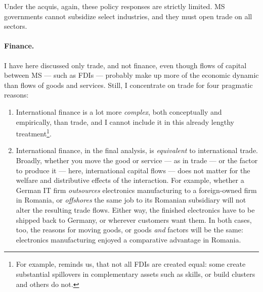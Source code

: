 Under the acquis, again, these policy responses are strictly limited. \gls{MS} governments cannot subsidize select industries, and they must open trade on all sectors.

\paragraph{Finance.} I have here discussed only trade, and not finance, even though flows of capital between \gls{MS} --- such as \glspl{FDI} --- probably make up more of the economic dynamic than flows of goods and services. Still, I concentrate on trade for four pragmatic reasons:
\begin{enumerate}
	\item International finance is a lot more \emph{complex}, both conceptually and empirically, than trade, and I cannot include it in this already lengthy treatment\footnote{
		For example, \cite{Narula2005} reminds us, that not all \glspl{FDI} are created equal: some create substantial spillovers in complementary assets such as skills, or build clusters and others do not.}.
	\item International finance, in the final analysis, is \emph{equivalent} to international trade. Broadly, whether you move the good or service --- as in trade --- or the factor to produce it --- here, international capital flows --- does not matter for the welfare and distributive effects of the interaction. For example, whether a German IT firm \emph{outsources} electronics manufacturing to a foreign-owned firm in Romania, or \emph{offshores} the same job to its Romanian subsidiary will not alter the resulting trade flows. Either way, the finished electronics have to be shipped back to Germany, or wherever customers want them. In both cases, too, the reasons for moving goods, or goods \emph{and} factors will be the same: electronics manufacturing enjoyed a comparative advantage in Romania.

\end{enumerate}

